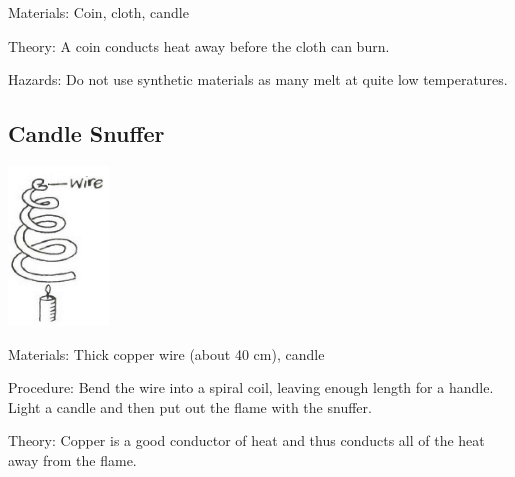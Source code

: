 \begin{multicols}{2}
\begin{description*}
\item[Materials:]{Coin, cloth, candle}
\item[Theory:]{A coin conducts heat away before the cloth can burn.}
\item[Hazards:]{Do not use synthetic materials as many melt at quite low temperatures.}
\end{description*}

\subsection{Candle Snuffer}

\begin{center}
\includegraphics[width=0.2\textwidth]{./img/vso/candle-snuffer.png}
\end{center}

\begin{description*}
\item[Materials:]{Thick copper wire (about 40 cm), candle}
\item[Procedure:]{Bend the wire into a spiral coil, leaving enough length for a handle. Light a candle and then put out the flame with the snuffer.}
\item[Theory:]{Copper is a good conductor of heat and thus conducts all of the heat away from the flame.}
\end{description*}


\end{multicols}
